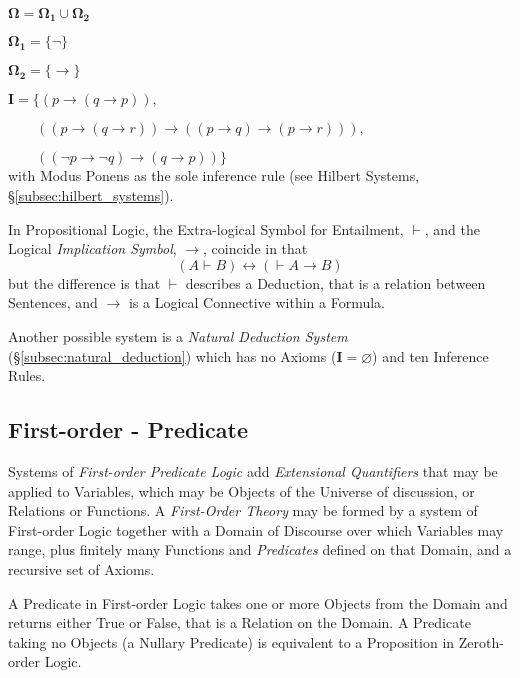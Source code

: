 \documentclass{article}
\begin{document}
$\mathbf{\Omega} = \mathbf{\Omega_1} \cup \mathbf{\Omega_2}$

$\mathbf{\Omega_1} = \{\neg\}$

$\mathbf{\Omega_2} = \{\rightarrow\}$

$\mathbf{I} = \{ (p \rightarrow (q \rightarrow p)),$

$\qquad((p \rightarrow (q \rightarrow r)) \rightarrow
(( p \rightarrow q) \rightarrow (p \rightarrow r))),$

$\qquad(( \neg p \rightarrow \neg q ) \rightarrow (q \rightarrow p ))
\}$\\ with Modus Ponens as the sole inference rule (see Hilbert
Systems, \S\ref{subsec:hilbert_systems}).

In Propositional Logic, the Extra-logical Symbol for Entailment,
$\vdash$, and the Logical \emph{Implication Symbol}, $\rightarrow$,
coincide in that
\[(A \vdash B) \leftrightarrow (\vdash A \rightarrow B)\]
but the difference is that $\vdash$ describes a Deduction, that is a
relation between Sentences, and $\rightarrow$ is a Logical Connective
within a Formula.

Another possible system is a \emph{Natural Deduction
  System}\cite{jaskowski34} (\S \ref{subsec:natural_deduction})
which has no Axioms ($\mathbf{I}=\varnothing$) and ten Inference
Rules.

\subsection{First-order - Predicate}

Systems of \emph{First-order Predicate Logic} add \emph{Extensional
  Quantifiers} that may be applied to Variables, which may be Objects
of the Universe of discussion, or Relations or Functions. A
\emph{First-Order Theory} may be formed by a system of First-order
Logic together with a Domain of Discourse over which Variables may
range, plus finitely many Functions and \emph{Predicates} defined on
that Domain, and a recursive set of Axioms.

A Predicate in First-order Logic takes one or more Objects from the
Domain and returns either True or False, that is a Relation on the
Domain. A Predicate taking no Objects (a Nullary Predicate) is
equivalent to a Proposition in Zeroth-order Logic.
\end{document}
